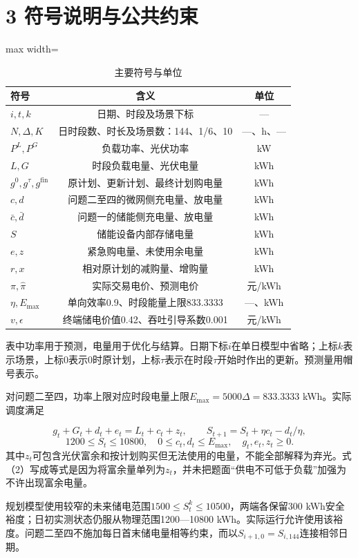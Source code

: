 \documentclass[UTF8,a4paper,zihao=-4,fontset=windows]{ctexart}
\begin{document}
\section{3 符号说明与公共约束}
\begin{table}[H]\centering\caption{主要符号与单位}
\fontsize{9.5}{12}\selectfont\setlength{\tabcolsep}{4pt}\renewcommand{\arraystretch}{1.12}
\begin{adjustbox}{max width=\linewidth}\begin{tabular}{lcc}\toprule
符号 & 含义 & 单位\\\midrule
$i,t,k$ & 日期、时段及场景下标 & —\\
$N,\Delta,K$ & 日时段数、时长及场景数：144、1/6、10 & —、h、—\\
$P^L,P^G$ & 负载功率、光伏功率 & kW\\
$L,G$ & 时段负载电量、光伏电量 & kWh\\
$g^0,g^{\tau},g^{\mathrm{fin}}$ & 原计划、更新计划、最终计划购电量 & kWh\\
$c,d$ & 问题二至四的微网侧充电量、放电量 & kWh\\
$\bar c,\bar d$ & 问题一的储能侧充电量、放电量 & kWh\\
$S$ & 储能设备内部存储电量 & kWh\\
$e,z$ & 紧急购电量、未使用余电量 & kWh\\
$r,x$ & 相对原计划的减购量、增购量 & kWh\\
$\pi,\widehat\pi$ & 实际交易电价、预测电价 & 元/kWh\\
$\eta,E_{\max}$ & 单向效率0.9、时段能量上限833.3333 & —、kWh\\
$v,\epsilon$ & 终端储电价值0.42、吞吐引导系数0.001 & 元/kWh\\
\bottomrule\end{tabular}\end{adjustbox}\end{table}
表中功率用于预测，电量用于优化与结算。日期下标$i$在单日模型中省略；上标$k$表示场景，上标0表示0时原计划，上标$\tau$表示在时段$\tau$开始时作出的更新。预测量用帽号表示。
\par
对问题二至四，功率上限对应时段电量上限$E_{\max}=5000\Delta=833.3333$ kWh。实际调度满足
\par
\begin{equation}
g_t+G_t+d_t+e_t=L_t+c_t+z_t,\qquad S_{t+1}=S_t+\eta c_t-d_t/\eta, \tag{2}
\end{equation}
\begin{equation}
1200\le S_t\le10800,\quad 0\le c_t,d_t\le E_{\max},\quad g_t,e_t,z_t\ge0. \tag{3}
\end{equation}
其中$z_t$可包含光伏富余和按计划购买但无法使用的电量，不能全部解释为弃光。式（2）写成等式是因为将富余量单列为$z_t$，并未把题面“供电不可低于负载”加强为不许出现富余电量。
\par
规划模型使用较窄的未来储电范围$1500\le S_t^k\le10500$，两端各保留300 kWh安全裕度；日初实测状态仍服从物理范围1200—10800 kWh。实际运行允许使用该裕度。问题二至四不施加每日首末储电量相等约束，而以$S_{i+1,0}=S_{i,144}$连接相邻日期。
\par
\end{document}
